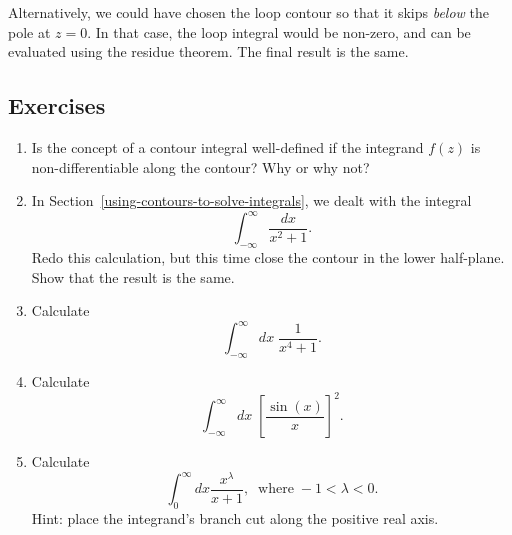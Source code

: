 \documentclass[10pt,a4paper]{article}
\begin{document}
Alternatively, we could have chosen the loop contour so that it skips
\emph{below} the pole at $z = 0$. In that case, the loop integral
would be non-zero, and can be evaluated using the residue theorem. The
final result is the same.

\subsection{Exercises}
\label{exercises}

\begin{enumerate}
\item
  Is the concept of a contour integral well-defined if the integrand
  $f(z)$ is non-differentiable along the contour? Why or why not?

\item
  In Section~\ref{using-contours-to-solve-integrals}, we dealt with
  the integral
  \begin{equation}
    \int_{-\infty}^\infty \frac{dx}{x^2 + 1}.
  \end{equation}
  Redo this calculation, but this time close the contour in the lower
  half-plane.  Show that the result is the same.

\item
  Calculate
  \begin{equation}
    \int_{-\infty}^\infty dx\; \frac{1}{x^4 + 1}.
  \end{equation}

\item
  Calculate
  \begin{equation}
    \int_{-\infty}^\infty dx\; \left[\frac{\sin(x)}{x}\right]^2.
  \end{equation}

\item
  Calculate
  \begin{equation}
    \int_0^\infty dx \frac{x^{\lambda}}{x+1}, \;\;\mathrm{where}\; -1 < \lambda < 0.
  \end{equation}
  Hint: place the integrand's branch cut along the positive real axis.


\end{enumerate}
\end{document}
